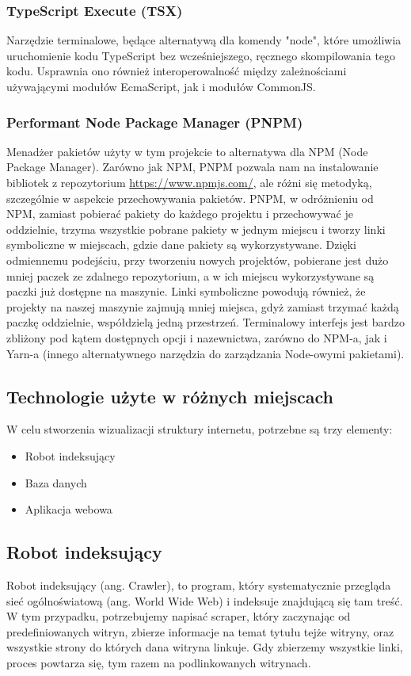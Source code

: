 \documentclass[a4paper, 12pt]{article}
\begin{document}
\subsubsection{TypeScript Execute (TSX)}
Narzędzie terminalowe, będące alternatywą dla komendy "node", które umożliwia uruchomienie kodu TypeScript bez wcześniejszego, ręcznego skompilowania tego kodu. Usprawnia ono również interoperowalność między zależnościami używającymi modułów EcmaScript, jak i modułów CommonJS.\cite{npmTsxReadme}
\subsubsection{Performant Node Package Manager (PNPM)}
Menadżer pakietów użyty w tym projekcie to alternatywa dla NPM (Node Package Manager). Zarówno jak NPM, PNPM pozwala nam na instalowanie bibliotek z repozytorium \url{https://www.npmjs.com/}, ale różni się metodyką, szczególnie w aspekcie przechowywania pakietów. PNPM, w odróżnieniu od NPM, zamiast pobierać pakiety do każdego projektu i przechowywać je oddzielnie, trzyma wszystkie pobrane pakiety w jednym miejscu i tworzy linki symboliczne w miejscach, gdzie dane pakiety są wykorzystywane.\cite{introPnpmDoc} Dzięki odmiennemu podejściu, przy tworzeniu nowych projektów, pobierane jest dużo mniej paczek ze zdalnego repozytorium, a w ich miejscu wykorzystywane są paczki już dostępne na maszynie. Linki symboliczne powodują również, że projekty na naszej maszynie zajmują mniej miejsca, gdyż zamiast trzymać każdą paczkę oddzielnie, współdzielą jedną przestrzeń. Terminalowy interfejs jest bardzo zbliżony pod kątem dostępnych opcji i nazewnictwa, zarówno do NPM-a, jak i Yarn-a (innego alternatywnego narzędzia do zarządzania Node-owymi pakietami).

\subsection{Technologie użyte w różnych miejscach}
W celu stworzenia wizualizacji struktury internetu, potrzebne są trzy elementy:
\begin{itemize}
	\item Robot indeksujący
	\item Baza danych
	\item Aplikacja webowa
\end{itemize}

\subsection{Robot indeksujący}
Robot indeksujący (ang. Crawler), to program, który systematycznie przegląda sieć ogólnoświatową (ang. World Wide Web) i indeksuje znajdującą się tam treść.\cite{cloudflareWebCrawler}\cite{wikiWebCrawler} W tym przypadku, potrzebujemy napisać scraper, który zaczynając od predefiniowanych witryn, zbierze informacje na temat tytułu tejże witryny, oraz wszystkie strony do których dana witryna linkuje. Gdy zbierzemy wszystkie linki, proces powtarza się, tym razem na podlinkowanych witrynach.
\end{document}
